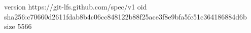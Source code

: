 version https://git-lfs.github.com/spec/v1
oid sha256:c70660d2611fdab8b4c06cc848122b88f25ace3f8e9bfa5fc51c364186884d6b
size 5566
